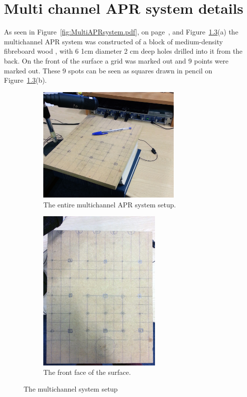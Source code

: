 \chapter{Multi channel APR system details}\label{ap:MultiAPRsystem}

\ifpdf
    \graphicspath{{Appendices/AppendixMultiAPRsystem/Photos/}{Appendices/AppendixMultiAPRsystem/Figs/}}
\else
\fi

As seen in Figure~\ref{fig:MultiAPRsystem.pdf}, on page~\pageref{fig:MultiAPRsystem.pdf}, and Figure~\ref{fig:multiAPRsystemwhole}(a) the multichannel APR system was constructed of a block of medium-density fibreboard wood , with 6 1cm diameter 2 cm deep holes drilled into it from the back. On the front of the surface a grid was marked out and 9 points were marked out. These 9 spots can be seen as squares drawn in pencil on Figure~\ref{fig:multiAPRsystemwhole}(b).


\begin{figure}
\centering
\begin{subfigure}{.5\textwidth}
  \centering
  \includegraphics[width=7cm]{wholesystem}
  \caption{The entire multichannel APR system setup.}
  \label{fig:sub1}
\end{subfigure}%
\begin{subfigure}{.5\textwidth}
  \centering
  \includegraphics[width=6cm]{surface}
  \caption{The front face of the surface.}
  \label{fig:sub2}
\end{subfigure}
\caption{The multichannel system setup}
\label{fig:multiAPRsystemwhole}
\end{figure}

